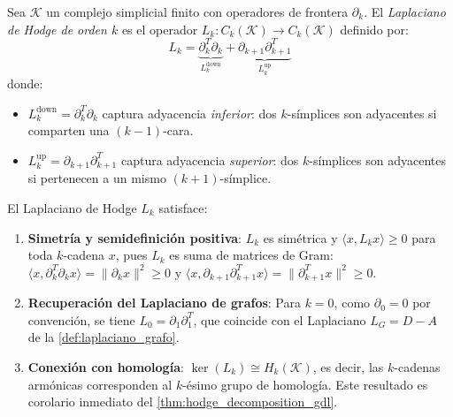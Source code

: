 \begin{definition}\label{def:hodge_laplacian_gdl}
	Sea $\mathcal{K}$ un complejo simplicial finito con operadores de frontera $\partial_k$. El \textit{Laplaciano de Hodge de orden $k$} es el operador $L_k: C_k(\mathcal{K}) \to C_k(\mathcal{K})$ definido por:
	\[
		L_k = \underbrace{\partial_k^T \partial_k}_{L_k^{\mathrm{down}}} + \underbrace{\partial_{k+1} \partial_{k+1}^T}_{L_k^{\mathrm{up}}}
	\]
	donde:
	\begin{itemize}
		\item $L_k^{\mathrm{down}} = \partial_k^T \partial_k$ captura adyacencia \textit{inferior}: dos $k$-símplices son adyacentes si comparten una $(k{-}1)$-cara.
		\item $L_k^{\mathrm{up}} = \partial_{k+1} \partial_{k+1}^T$ captura adyacencia \textit{superior}: dos $k$-símplices son adyacentes si pertenecen a un mismo $(k{+}1)$-símplice.
	\end{itemize}
\end{definition}

\begin{proposition}\label{prop:propiedades_hodge_gdl}
	El Laplaciano de Hodge $L_k$ satisface:
	\begin{enumerate}
		\item \textbf{Simetría y semidefinición positiva}: $L_k$ es simétrica y $\langle x, L_k x \rangle \geq 0$ para toda $k$-cadena $x$, pues $L_k$ es suma de matrices de Gram: $\langle x, \partial_k^T \partial_k x \rangle = \|\partial_k x\|^2 \geq 0$ y $\langle x, \partial_{k+1} \partial_{k+1}^T x \rangle = \|\partial_{k+1}^T x\|^2 \geq 0$.
		\item \textbf{Recuperación del Laplaciano de grafos}: Para $k = 0$, como $\partial_0 = 0$ por convención, se tiene $L_0 = \partial_1 \partial_1^T$, que coincide con el Laplaciano $L_G = D - A$ de la \autoref{def:laplaciano_grafo}.
		\item \textbf{Conexión con homología}: $\ker(L_k) \cong H_k(\mathcal{K})$, es decir, las $k$-cadenas armónicas corresponden al $k$-ésimo grupo de homología. Este resultado es corolario inmediato del \autoref{thm:hodge_decomposition_gdl}.
	\end{enumerate}
\end{proposition}


